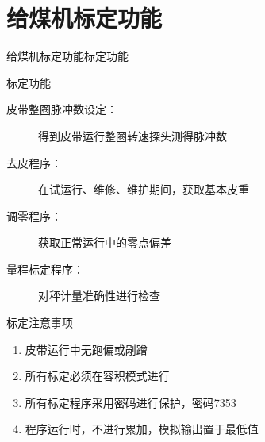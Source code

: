 \documentclass[12pt,hyperref={CJKbookmarks=true}]{beamer} %
\begin{document}
\section{给煤机标定功能}
	\begin{frame}{给煤机标定功能}{标定功能}
		
\begin{block}{标定功能}
				\begin{description}
				\item[皮带整圈脉冲数设定：]  得到皮带运行整圈转速探头测得脉冲数
\item[去皮程序：]在试运行、维修、维护期间，获取基本皮重
\item[调零程序：]获取正常运行中的零点偏差
\item[量程标定程序：]对秤计量准确性进行检查
			

				\end{description}
\end{block}
	\begin{block}{标定注意事项}
\begin{enumerate}
\item  皮带运行中无跑偏或剐蹭
				\item  所有标定必须在容积模式进行
				\item  所有标定程序采用密码进行保护，密码7353
				\item  程序运行时，不进行累加，模拟输出置于最低值
				\end{enumerate}
				
\end{block}
	\end{frame}
\end{document}
